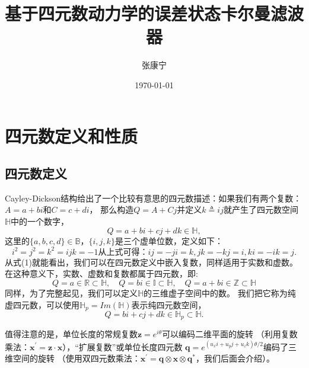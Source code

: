 \documentclass[10pt, a4paper]{article}
\begin{document}
  \title{基于四元数动力学的误差状态卡尔曼滤波器}
  \author{张康宁}
  \date{\today}
  \maketitle
  \thispagestyle{empty}
  \newpage

  \setcounter{tocdepth}{3}
  \tableofcontents
  \listoffigures
  \listoftables
  \thispagestyle{empty}
  \newpage

  \section{四元数定义和性质}

  \subsection{四元数定义}
  \setlength{\parindent}{2 em}
  Cayley-Dickson结构给出了一个比较有意思的四元数描述：如果我们有两个复数：$A = a + bi$和$C = c + di$，
  那么构造$Q = A + Cj$并定义$k \triangleq ij$就产生了四元数空间$\mathbb{H}$中的一个数字，
  \begin{equation} \label{eq-1}
    Q = a + bi + cj + dk \in \mathbb{H},
  \end{equation}
  这里的$\{a,b,c,d\} \in \mathbb{B}$，$\{i, j, k\}$是三个虚单位数，定义如下：
  \begin{subequations} \label{eq-2}
    \begin{equation}
      i^2 = j^2 = k^2 = ijk = -1
    \end{equation}
  从上式可得：
  \begin{equation}
    ij = -ji = k, jk = -kj = i, ki = -ik = j.
  \end{equation}
  \end{subequations}
  从式(1)就能看出，我们可以在四元数定义中嵌入复数，同样适用于实数和虚数。
  在这种意义下，实数、虚数和复数都属于四元数，即:
  \begin{equation} \label{eq-3}
    Q = a \in \mathbb{R} \subset \mathbb{H}, \quad
    Q = bi \in \mathbb{I} \subset \mathbb{H}, \quad
    Q = a + bi \in \mathbb{Z} \subset \mathbb{H}
  \end{equation}
  同样，为了完整起见，我们可以定义$\mathbb{H}$的三维虚子空间中的数。
  我们把它称为纯虚四元数，可以使用$\mathbb{H}_{p}=Im(\mathbb{H})$表示纯四元数空间，
  \begin{equation} \label{eq-4}
    Q = bi + cj + dk \in \mathbb{H}_{p} \subset \mathbb{H}.
  \end{equation}
  \par
  值得注意的是，单位长度的常规复数$\mathbf{z}=e^{i\theta}$可以编码二维平面的旋转
  （利用复数乘法：$\mathbf{x}^{'}=\mathbf{z} \cdot \mathbf{x}$），“扩展复数”或单位长度四元数
  $\mathbf{q} = e^{(u_xi + u_yj + u_zk)\theta/2}$编码了三维空间的旋转
  （使用双四元数乘法：$\mathbf{x}^{'}=\mathbf{q} \otimes \mathbf{x} \otimes \mathbf{q}^{*}$，我们后面会介绍）。
\end{document}
